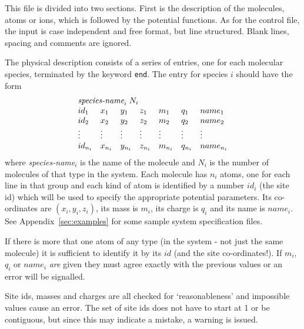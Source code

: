 This file is divided into two sections.  First is the description of
the molecules, atoms or ions, which is followed by the potential
functions.  As for the control file, the input is case independent and
free format, but line structured. Blank lines, spacing and comments
are ignored.

The physical description consists of a series of entries, one for each
molecular species, terminated by the keyword \verb'end'. The entry
for species $i$ should have the form
\begin{displaymath}
\begin{array}{lllllll}
\multicolumn{7}{l}{\mbox{{\it species-name}}_{i} \; N_{i}}  \\
id_{1} & x_{1} & y_{1} & z_{1}&  m_{1} & q_{1} & name_{1} \\
id_{2} & x_{2} & y_{2} & z_{2}&  m_{2} & q_{2} & name_{2} \\
\vdots & \vdots & \vdots & \vdots & \vdots & \vdots & \vdots \\
id_{n_{i}} & x_{n_{i}} & y_{n_{i}} & z_{n_{i}}& 
m_{n_{i}} & q_{n_{i}} & name_{n_{i}} \\
\end{array}
\end{displaymath}
where {\it species-name}$_{i}$ is the name of the molecule and $N_{i}$
is the number of molecules of that type in the system. Each molecule
has $n_{i}$ atoms, one for each line in that group and each kind of
atom is identified by a number $id_{i}$ (the site id) which will be
used to specify the appropriate potential parameters. Its co-ordinates
are $(x_{i},y_{i},z_{i})$, its mass is $m_{i}$, its charge is $q_{i}$
and its name is $name_{i}$.  See Appendix~\ref{sec:examples} for some
sample system specification files.

If there is more that one atom of any type (in the system - not just
the same molecule) it is sufficient to identify it by its $id$ (and
the site co-ordinates!).  If $m_{i}$, $q_{i}$ or $name_{i}$ {\em are\/}
given they must agree exactly with the previous values or an error
will be signalled.

Site ids, masses and charges are all checked for `reasonableness'
and impossible values cause an error. The set of site ids does not
have to start at 1 or be contiguous, but since this may indicate a
mistake, a warning is issued.

